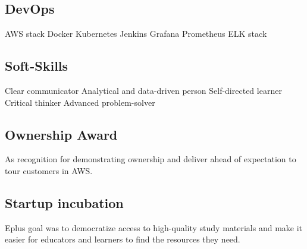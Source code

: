 \documentclass[a4paper]{MagicalCV}
\begin{document}
\begin{minipage}[t]{0.33\textwidth}
\subsection{DevOps}
AWS stack \textbullet{} Docker \textbullet{} Kubernetes \textbullet{} Jenkins \textbullet{} Grafana \textbullet{} Prometheus \textbullet{}  ELK stack
\sectionsep

\subsection{Soft-Skills}
Clear communicator \textbullet{} Analytical and data-driven person \textbullet{} Self-directed learner \textbullet{} Critical thinker \textbullet{}  Advanced problem-solver 
\sectionsep


\subsection{Ownership Award}
\vspace{\topsep} %
As recognition for demonstrating ownership and deliver ahead of expectation to tour customers in AWS.
\sectionsep

\subsection{Startup incubation}
\vspace{\topsep} %
Eplus goal was to democratize access to high-quality study materials and make it easier for educators and learners to find the resources they need.
\sectionsep

\end{minipage} 
\hfill
\end{document}
